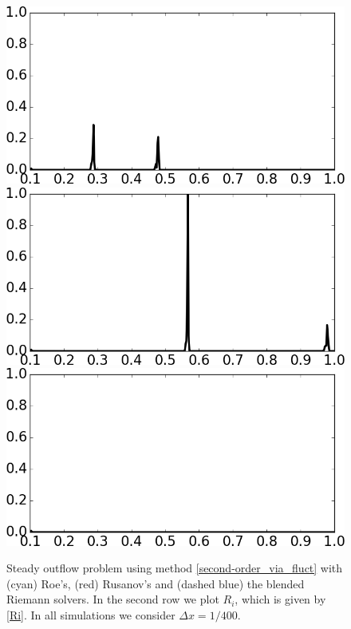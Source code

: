 \documentclass[preprint, 11pt]{article}
\begin{document}
\begin{figure}[!h]
{    \vspace{15pt}
    \includegraphics[scale=0.29]{figures/outflow_1D_Ri_t0p5.png}
    \qquad
    \includegraphics[scale=0.29]{figures/outflow_1D_Ri_t1p3.png}
    \qquad
    \includegraphics[scale=0.29]{figures/outflow_1D_Ri_t10p0.png}
  }
  \caption{
    Steady outflow problem using method \eqref{second-order_via_fluct} with 
    (cyan) Roe's, (red) Rusanov's and (dashed blue) the blended Riemann solvers.
    In the second row we plot $R_i$, which is given by \eqref{Ri}.
    In all simulations we consider $\Delta x=1/400$.
    \label{fig:steady_outflow}}
\end{figure}
\end{document}
